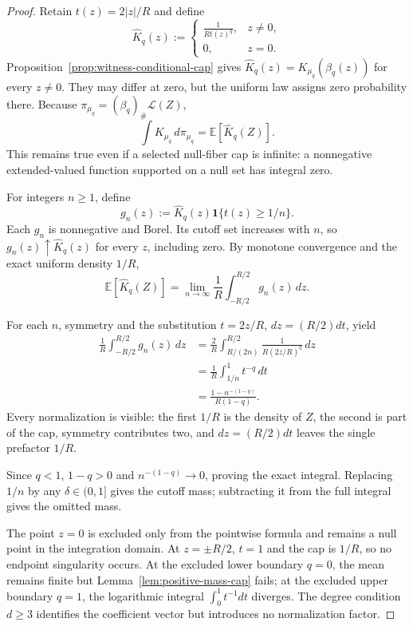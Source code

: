 \begin{proof}
Retain $t(z)=2|z|/R$ and define
\[
\widehat K_q(z):=
\begin{cases}
\displaystyle\frac{1}{Rt(z)^q},&z\neq0,\\[6pt]
0,&z=0.
\end{cases}
\]
Proposition~\ref{prop:witness-conditional-cap} gives
$\widehat K_q(z)=K_{\mu_q}(\beta_q(z))$ for every $z\neq0$.  They may
differ at zero, but the uniform law assigns zero probability there.
Because $\pi_{\mu_q}=(\beta_q)_\#\mathcal L(Z)$,
\[
\int K_{\mu_q}\,d\pi_{\mu_q}
=\mathbb E[\widehat K_q(Z)].
\]
This remains true even if a selected null-fiber cap is infinite: a
nonnegative extended-valued function supported on a null set has integral
zero.

For integers $n\geq1$, define
\[
g_n(z):=\widehat K_q(z)\mathbf1\{t(z)\geq1/n\}.
\]
Each $g_n$ is nonnegative and Borel.  Its cutoff set increases with $n$,
so $g_n(z)\uparrow\widehat K_q(z)$ for every $z$, including zero.  By
monotone convergence and the exact uniform density $1/R$,
\[
\mathbb E[\widehat K_q(Z)]
=\lim_{n\to\infty}\frac1R
\int_{-R/2}^{R/2}g_n(z)\,dz.
\]

For each $n$, symmetry and the substitution
$t=2z/R$, $dz=(R/2)dt$, yield
\[
\begin{aligned}
\frac1R\int_{-R/2}^{R/2}g_n(z)\,dz
&=\frac{2}{R}\int_{R/(2n)}^{R/2}
  \frac{1}{R(2z/R)^q}\,dz\\
&=\frac1R\int_{1/n}^{1}t^{-q}\,dt\\
&=\frac{1-n^{-(1-q)}}{R(1-q)}.
\end{aligned}
\]
Every normalization is visible: the first $1/R$ is the density of $Z$,
the second is part of the cap, symmetry contributes two, and
$dz=(R/2)dt$ leaves the single prefactor $1/R$.

Since $q<1$, $1-q>0$ and $n^{-(1-q)}\to0$, proving the exact integral.
Replacing $1/n$ by any $\delta\in(0,1]$ gives the cutoff mass; subtracting
it from the full integral gives the omitted mass.

The point $z=0$ is excluded only from the pointwise formula and remains a
null point in the integration domain.  At $z=\pm R/2$, $t=1$ and the cap
is $1/R$, so no endpoint singularity occurs.  At the excluded lower
boundary $q=0$, the mean remains finite but
Lemma~\ref{lem:positive-mass-cap} fails; at the excluded upper boundary
$q=1$, the logarithmic integral $\int_0^1t^{-1}dt$ diverges.  The degree
condition $d\geq3$ identifies the coefficient vector but introduces no
normalization factor.
\end{proof}

